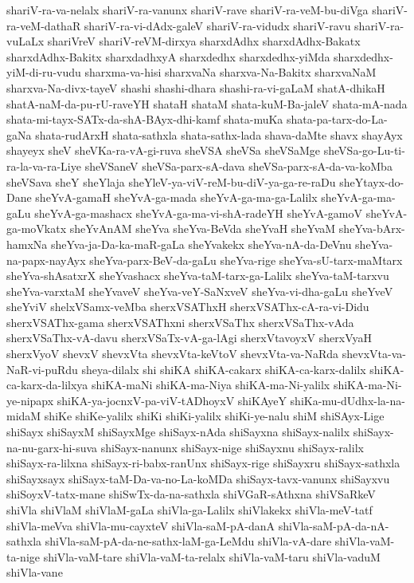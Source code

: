 {shariV-ra-va-nelalx
shariV-ra-vanunx
shariV-rave
shariV-ra-veM-bu-diVga
shariV-ra-veM-dathaR
shariV-ra-vi-dAdx-galeV
shariV-ra-vidudx
shariV-ravu
shariV-ra-vuLaLx
shariVreV
shariV-reVM-dirxya
sharxdAdhx
sharxdAdhx-Bakatx
sharxdAdhx-Bakitx
sharxdadhxyA
sharxdedhx
sharxdedhx-yiMda
sharxdedhx-yiM-di-ru-vudu
sharxma-va-hisi
sharxvaNa
sharxva-Na-Bakitx
sharxvaNaM
sharxva-Na-divx-tayeV
shashi
shashi-dhara
shashi-ra-vi-gaLaM
shatA-dhikaH
shatA-naM-da-pu-rU-raveYH
shataH
shataM
shata-kuM-Ba-jaleV
shata-mA-nada
shata-mi-tayx-SATx-da-shA-BAyx-dhi-kamf
shata-muKa
shata-pa-tarx-do-La-gaNa
shata-rudArxH
shata-sathxla
shata-sathx-lada
shava-daMte
shavx
shayAyx
shayeyx
sheV
sheVKa-ra-vA-gi-ruva
sheVSA
sheVSa
sheVSaMge
sheVSa-go-Lu-ti-ra-la-va-ra-Liye
sheVSaneV
sheVSa-parx-sA-dava
sheVSa-parx-sA-da-va-koMba
sheVSava
sheY
sheYlaja
sheYleV-ya-viV-reM-bu-diV-ya-ga-re-raDu
sheYtayx-do-Dane
sheYvA-gamaH
sheYvA-ga-mada
sheYvA-ga-ma-ga-Lalilx
sheYvA-ga-ma-gaLu
sheYvA-ga-mashacx
sheYvA-ga-ma-vi-shA-radeYH
sheYvA-gamoV
sheYvA-ga-moVkatx
sheYvAnAM
sheYva
sheYva-BeVda
sheYvaH
sheYvaM
sheYva-bArx-hamxNa
sheYva-ja-Da-ka-maR-gaLa
sheYvakekx
sheYva-nA-da-DeVnu
sheYva-na-papx-nayAyx
sheYva-parx-BeV-da-gaLu
sheYva-rige
sheYva-sU-tarx-maMtarx
sheYva-shAsatxrX
sheYvashacx
sheYva-taM-tarx-ga-Lalilx
sheYva-taM-tarxvu
sheYva-varxtaM
sheYvaveV
sheYva-veY-SaNxveV
sheYva-vi-dha-gaLu
sheYveV
sheYviV
shelxVSamx-veMba
sherxVSAThxH
sherxVSAThx-cA-ra-vi-Didu
sherxVSAThx-gama
sherxVSAThxni
sherxVSaThx
sherxVSaThx-vAda
sherxVSaThx-vA-davu
sherxVSaTx-vA-ga-lAgi
sherxVtavoyxV
sherxVyaH
sherxVyoV
shevxV
shevxVta
shevxVta-keVtoV
shevxVta-va-NaRda
shevxVta-va-NaR-vi-puRdu
sheya-dilalx
shi
shiKA
shiKA-cakarx
shiKA-ca-karx-dalilx
shiKA-ca-karx-da-lilxya
shiKA-maNi
shiKA-ma-Niya
shiKA-ma-Ni-yalilx
shiKA-ma-Ni-ye-nipapx
shiKA-ya-jocnxV-pa-viV-tADhoyxV
shiKAyeY
shiKa-mu-dUdhx-la-na-midaM
shiKe
shiKe-yalilx
shiKi
shiKi-yalilx
shiKi-ye-nalu
shiM
shiSAyx-Lige
shiSayx
shiSayxM
shiSayxMge
shiSayx-nAda
shiSayxna
shiSayx-nalilx
shiSayx-na-nu-garx-hi-suva
shiSayx-nanunx
shiSayx-nige
shiSayxnu
shiSayx-ralilx
shiSayx-ra-lilxna
shiSayx-ri-babx-ranUnx
shiSayx-rige
shiSayxru
shiSayx-sathxla
shiSayxsayx
shiSayx-taM-Da-va-no-La-koMDa
shiSayx-tavx-vanunx
shiSayxvu
shiSoyxV-tatx-mane
shiSwTx-da-na-sathxla
shiVGaR-sAthxna
shiVSaRkeV
shiVla
shiVlaM
shiVlaM-gaLa
shiVla-ga-Lalilx
shiVlakekx
shiVla-meV-tatf
shiVla-meVva
shiVla-mu-cayxteV
shiVla-saM-pA-danA
shiVla-saM-pA-da-nA-sathxla
shiVla-saM-pA-da-ne-sathx-laM-ga-LeMdu
shiVla-vA-dare
shiVla-vaM-ta-nige
shiVla-vaM-tare
shiVla-vaM-ta-relalx
shiVla-vaM-taru
shiVla-vaduM
shiVla-vane
}
